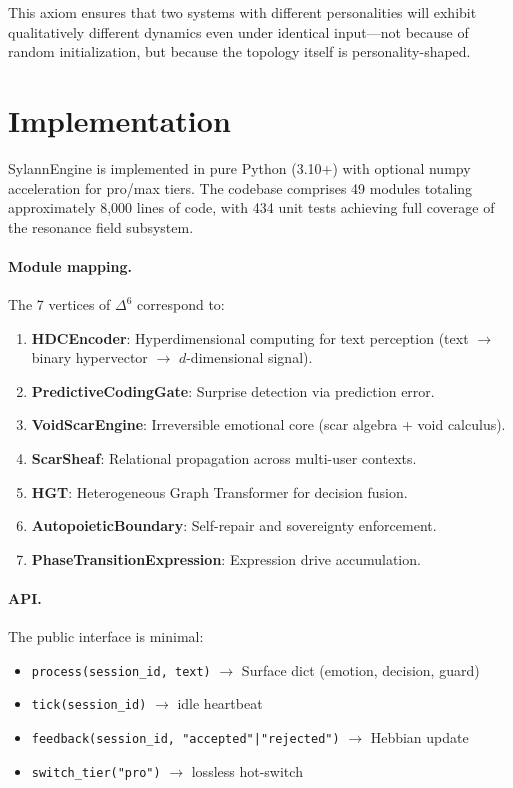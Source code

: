 \documentclass[11pt]{article}
\begin{document}
This axiom ensures that two systems with different personalities will exhibit qualitatively different dynamics even under identical input---not because of random initialization, but because the topology itself is personality-shaped.

\section{Implementation}
\label{sec:implementation}

SylannEngine is implemented in pure Python (3.10+) with optional numpy acceleration for pro/max tiers. The codebase comprises 49 modules totaling approximately 8,000 lines of code, with 434 unit tests achieving full coverage of the resonance field subsystem.

\paragraph{Module mapping.} The 7 vertices of $\Delta^6$ correspond to:
\begin{enumerate}[leftmargin=*, start=0]
\item \textbf{HDCEncoder}: Hyperdimensional computing for text perception (text $\to$ binary hypervector $\to$ $d$-dimensional signal).
\item \textbf{PredictiveCodingGate}: Surprise detection via prediction error.
\item \textbf{VoidScarEngine}: Irreversible emotional core (scar algebra + void calculus).
\item \textbf{ScarSheaf}: Relational propagation across multi-user contexts.
\item \textbf{HGT}: Heterogeneous Graph Transformer for decision fusion.
\item \textbf{AutopoieticBoundary}: Self-repair and sovereignty enforcement.
\item \textbf{PhaseTransitionExpression}: Expression drive accumulation.
\end{enumerate}

\paragraph{API.} The public interface is minimal:
\begin{itemize}[leftmargin=*]
\item \texttt{process(session\_id, text)} $\to$ Surface dict (emotion, decision, guard)
\item \texttt{tick(session\_id)} $\to$ idle heartbeat
\item \texttt{feedback(session\_id, "accepted"|"rejected")} $\to$ Hebbian update
\item \texttt{switch\_tier("pro")} $\to$ lossless hot-switch
\end{itemize}
\end{document}
